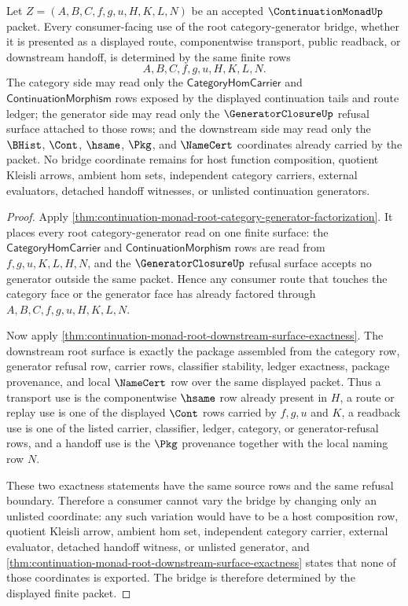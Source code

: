 \begin{lemma}
\label{lem:continuation-monad-root-category-generator-bridge-determinacy}
Let $Z=(A,B,C,f,g,u,H,K,L,N)$ be an accepted $\ContinuationMonadUp$ packet. Every consumer-facing use of the root category-generator bridge, whether it is presented as a displayed route, componentwise transport, public readback, or downstream handoff, is determined by the same finite rows
$$
A,B,C,f,g,u,H,K,L,N.
$$
The category side may read only the $\mathsf{CategoryHomCarrier}$ and $\mathsf{ContinuationMorphism}$ rows exposed by the displayed continuation tails and route ledger; the generator side may read only the $\GeneratorClosureUp$ refusal surface attached to those rows; and the downstream side may read only the $\BHist$, $\Cont$, $\hsame$, $\Pkg$, and $\NameCert$ coordinates already carried by the packet. No bridge coordinate remains for host function composition, quotient Kleisli arrows, ambient hom sets, independent category carriers, external evaluators, detached handoff witnesses, or unlisted continuation generators.
\end{lemma}
\begin{proof}
Apply \autoref{thm:continuation-monad-root-category-generator-factorization}. It places every root category-generator read on one finite surface: the $\mathsf{CategoryHomCarrier}$ and $\mathsf{ContinuationMorphism}$ rows are read from $f,g,u,K,L,H,N$, and the $\GeneratorClosureUp$ refusal surface accepts no generator outside the same packet. Hence any consumer route that touches the category face or the generator face has already factored through $A,B,C,f,g,u,H,K,L,N$.

Now apply \autoref{thm:continuation-monad-root-downstream-surface-exactness}. The downstream root surface is exactly the package assembled from the category row, generator refusal row, carrier rows, classifier stability, ledger exactness, package provenance, and local $\NameCert$ row over the same displayed packet. Thus a transport use is the componentwise $\hsame$ row already present in $H$, a route or replay use is one of the displayed $\Cont$ rows carried by $f,g,u$ and $K$, a readback use is one of the listed carrier, classifier, ledger, category, or generator-refusal rows, and a handoff use is the $\Pkg$ provenance together with the local naming row $N$.

These two exactness statements have the same source rows and the same refusal boundary. Therefore a consumer cannot vary the bridge by changing only an unlisted coordinate: any such variation would have to be a host composition row, quotient Kleisli arrow, ambient hom set, independent category carrier, external evaluator, detached handoff witness, or unlisted generator, and \autoref{thm:continuation-monad-root-downstream-surface-exactness} states that none of those coordinates is exported. The bridge is therefore determined by the displayed finite packet.
\end{proof}
